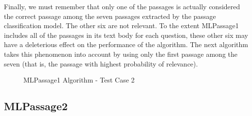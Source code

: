 Finally, we must remember that only one of the passages is actually considered the correct passage among the seven passages extracted by the passage classification model.  The other six are not relevant.  To the extent MLPassage1 includes all of the passages in its text body for each question, these other six may have a deleterious effect on the performance of the algorithm.  The next algorithm takes this phenomenon into account by using only the first passage among the seven (that is, the passage with highest probability of relevance).

\begin{figure}
\centering
\vspace{1.0in}
\caption{MLPassage1 Algorithm - Test Case 2}
\label{fig:mlpassage1_test_case_incorrect}
\end{figure}


\subsection{MLPassage2}

